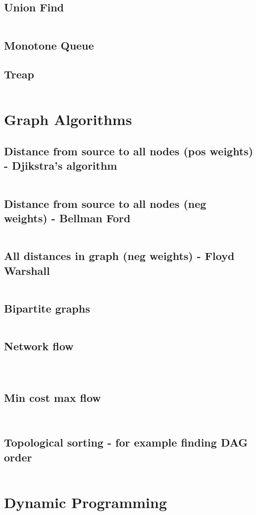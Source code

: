 \documentclass[8pt,a4paper,landscape,oneside]{amsart}
\newcommand{\codej}[1]{\inputminted[fontsize=\large,tabsize=2,baselinestretch=1]{java}{code/#1}}
\newcommand{\codec}[1]{\inputminted[fontsize=\large,tabsize=2,baselinestretch=1]{cpp}{code/#1}}
\newcommand{\codep}[1]{\inputminted[fontsize=\large,tabsize=2,baselinestretch=1]{py}{code/#1}}
\begin{document}
\begin{multicols*}{2}
\begin{large}
\subsection{Union Find}
\codep{unionfind.py}
\subsection{Monotone Queue}
\subsection{Treap}
\codec{Treap.cpp}
\section{Graph Algorithms}
\subsection{Distance from source to all nodes (pos weights) - Djikstra's algorithm}
\codep{djikstra.py}
\subsection{Distance from source to all nodes (neg weights) - Bellman Ford}
\codep{bellmanford.py}
\subsection{All distances in graph (neg weights) - Floyd Warshall}
\codep{floydwarshall.py}
\subsection{Bipartite graphs}
\codec{kuhns.cpp}
\subsection{Network flow}
\codec{dinic.cpp}
\codep{maxflow.py}
\codep{maxflow2.py}
\subsection{Min cost max flow}
\codep{mincostmaxflow.py}
\codej{mincostmaxflow.java}
\subsection{Topological sorting - for example finding DAG order}
\codep{topsort.py}
\section{Dynamic Programming}

\end{large}
\end{multicols*}
\end{document}
